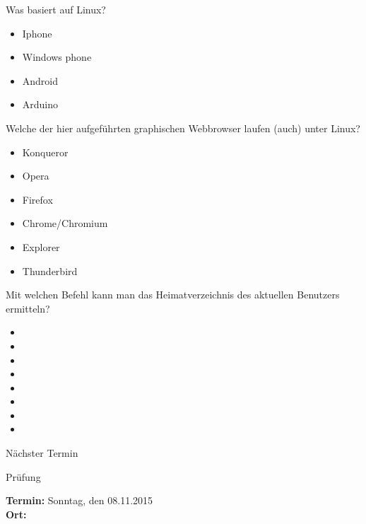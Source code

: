 \documentclass[aspectratio=43]{beamer}
\begin{document}
\begin{frame}{}
  \begin{block}{Was basiert auf Linux?}
    \begin{itemize}
      \item Iphone
      \item Windows phone
      \item Android
      \item Arduino
    \end{itemize}
  \end{block}
\end{frame}

\begin{frame}{}
  \begin{block}{Welche der hier aufgeführten graphischen Webbrowser laufen (auch) unter Linux?}
    \begin{itemize}
      \item Konqueror
      \item Opera
      \item Firefox
      \item Chrome/Chromium
      \item Explorer
      \item Thunderbird
    \end{itemize}
  \end{block}
\end{frame}


\begin{frame}{}
  \begin{block}{Mit welchen Befehl kann man das Heimatverzeichnis des aktuellen Benutzers ermitteln?}
    \begin{itemize}
      \item {}
      \item {}
      \item {}
      \item {}
      \item {}
      \item {}
      \item {}
      \item {}
    \end{itemize}
  \end{block}
\end{frame}

\begin{frame}[plain]
  \begin{alertblock}{Nächster Termin}
    \begin{center}
      

    \Huge{Prüfung}
    \end{center}
    \textbf{Termin:} Sonntag, den 08.11.2015 \\
    \textbf{Ort:} \\
  \end{alertblock}
\end{frame}


\materialframe
\versionframe
\end{document}
